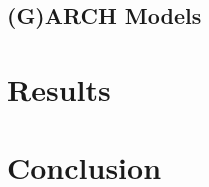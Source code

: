 \documentclass[a4paper, 11pt]{article}
\theoremstyle{definition} %
\numberwithin{equation}{section}
\begin{document}
  \subsection{(G)ARCH Models} \label{sub:garch}

\section{Results} \label{sec:results}

\section{Conclusion} \label{sec:conclusion}

\newpage


\end{document}
